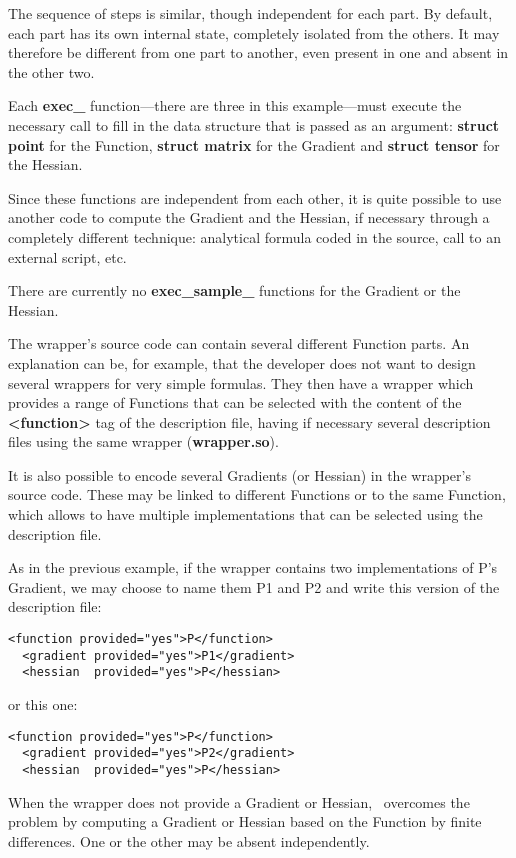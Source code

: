 The sequence of steps is similar, though independent for each part. By default, each part has its own internal state, completely isolated from the others. It may therefore be different from one part to another, even present in one and absent in the other two.

Each {\bf exec\_} function---there are three in this example---must execute the necessary call to fill in the data structure that is passed as an argument: {\bf struct point} for the Function, {\bf struct matrix} for the Gradient and {\bf struct tensor} for the Hessian.

Since these functions are independent from each other, it is quite possible to use another code to compute the Gradient and the Hessian, if necessary through a completely different technique: analytical formula coded in the source, call to an external script, etc.

There are currently no {\bf exec\_sample\_} functions for the Gradient or the Hessian.

The wrapper's source code can contain several different Function parts. An explanation can be, for example, that the developer does not want to design several wrappers for very simple formulas. They then have a wrapper which provides a range of Functions that can be selected with the content of the {\bf <function>} tag of the description file, having if necessary several description files using the same wrapper ({\bf wrapper.so}).

It is also possible to encode several Gradients (or Hessian) in the wrapper's source code. These may be linked to different Functions or to the same Function, which allows to have multiple implementations that can be selected using the description file.

As in the previous example, if the wrapper contains two implementations of P's Gradient, we may choose to name them P1 and P2 and write this version of the description file:

\lstset{language=C++, basicstyle=\normalsize}
\begin{lstlisting}[frame=TBRL]
  <function provided="yes">P</function>
  <gradient provided="yes">P1</gradient>
  <hessian  provided="yes">P</hessian>
\end{lstlisting}

or this one:

\lstset{language=C++, basicstyle=\normalsize}
\begin{lstlisting}[frame=TBRL]
  <function provided="yes">P</function>
  <gradient provided="yes">P2</gradient>
  <hessian  provided="yes">P</hessian>
\end{lstlisting}

When the wrapper does not provide a Gradient or Hessian, \OT\ overcomes the problem by computing a Gradient or Hessian based on the Function by finite differences. One or the other may be absent independently.
